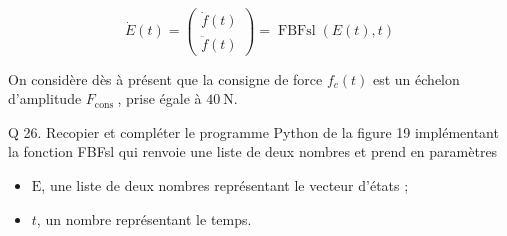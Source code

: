 \documentclass[10pt]{article}
\begin{document}
$$
\dot{E}(t)=\left(\begin{array}{c}
\dot{f}(t) \\
\ddot{f}(t)
\end{array}\right)=\operatorname{FBFsl}(E(t), t)
$$

On considère dès à présent que la consigne de force $f_{c}(t)$ est un échelon d'amplitude $F_{\text {cons }}$, prise égale à $40 \mathrm{~N}$.

Q 26. Recopier et compléter le programme Python de la figure 19 implémentant la fonction FBFsl qui renvoie une liste de deux nombres et prend en paramètres

\begin{itemize}
  \item $\mathrm{E}$, une liste de deux nombres représentant le vecteur d'états ;

  \item $t$, un nombre représentant le temps.

\end{itemize}
\end{document}
